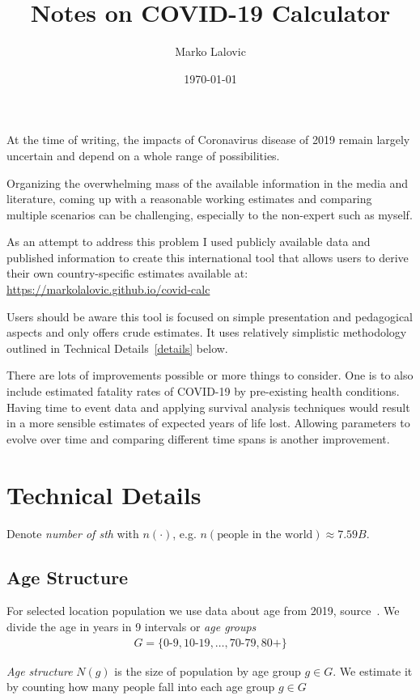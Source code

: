 \documentclass[12pt]{article}
\title{Notes on COVID-19 Calculator}
\author{Marko Lalovic}
\date{\today}
\begin{document}
\maketitle

 At the time of writing, the impacts of Coronavirus disease of 2019
remain largely uncertain and depend on a whole range of possibilities.

Organizing the overwhelming mass of the available information in the media and literature,
coming up with a reasonable working estimates and comparing multiple scenarios can be challenging,
especially to the non-expert such as myself.

As an attempt to address this problem I used publicly available data and published information
to create this international tool that allows users to derive their own country-specific estimates available at: \url{https://markolalovic.github.io/covid-calc}

Users should be aware this tool is focused on simple presentation and pedagogical aspects and only offers crude estimates. It uses relatively simplistic methodology outlined in Technical Details~\ref{details} below.

There are lots of improvements possible or more things to consider. One is to also include estimated fatality rates of COVID-19 by pre-existing health conditions. Having time to event data and applying survival analysis techniques would result in a more sensible estimates of expected years of life lost. Allowing parameters to evolve over time and comparing different time spans is another improvement.

\section*{Technical Details}\label{details}
Denote {\it number of sth} with $n(\cdot)$, e.g. $n(\text{people in the world}) \approx 7.59B$.

\subsection*{Age Structure}
For selected location population we use data about age from 2019, source~\cite{pyramids}. We divide the age in years in 9 intervals or {\it age groups}
\begin{align*}
G =
  \{ \text{0-9}, \text{10-19}, \ldots, \text{70-79}, \text{80+} \}
\end{align*}

{\it Age structure} $N(g)$ is the size of population by age group $g \in G$. We estimate it by counting how many people fall into each age group $g \in G$
\end{document}
